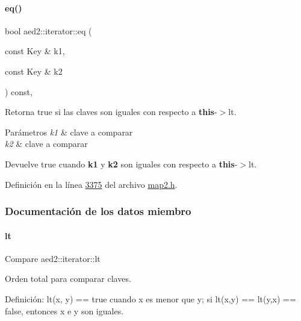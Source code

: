 \paragraph{\texorpdfstring{eq()}{eq()}}
{\footnotesize\ttfamily bool aed2\+::iterator\+::eq (\begin{DoxyParamCaption}\item[{const Key \&}]{k1,  }\item[{const Key \&}]{k2 }\end{DoxyParamCaption}) const\hspace{0.3cm}{\ttfamily [inline]}, {\ttfamily [private]}}



Retorna true si las claves son iguales con respecto a {\bfseries this}-\/$>$lt. 


\begin{DoxyParams}{Parámetros}
{\em k1} & clave a comparar \\
\hline
{\em k2} & clave a comparar \\
\hline
\end{DoxyParams}
\begin{DoxyReturn}{Devuelve}
true cuando {\bfseries k1} y {\bfseries k2} son iguales con respecto a {\bfseries this}-\/$>$lt. 
\end{DoxyReturn}


Definición en la línea \hyperlink{map2_8h_source_l03375}{3375} del archivo \hyperlink{map2_8h_source}{map2.\+h}.



\subsubsection{Documentación de los datos miembro}
\mbox{\label{classaed2_1_1iterator_a3f219bfe5e047bbec03e3339770ae414_a3f219bfe5e047bbec03e3339770ae414}} 
\paragraph{\texorpdfstring{lt}{lt}}
{\footnotesize\ttfamily Compare aed2\+::iterator\+::lt\hspace{0.3cm}{\ttfamily [private]}}



Orden total para comparar claves. 

Definición\+: lt(x, y) == true cuando x es menor que y; si lt(x,y) == lt(y,x) == false, entonces x e y son iguales. 

